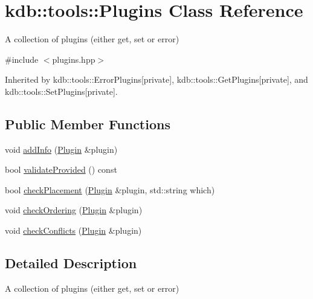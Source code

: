 \hypertarget{classkdb_1_1tools_1_1Plugins}{\section{kdb\-:\-:tools\-:\-:Plugins Class Reference}
\label{classkdb_1_1tools_1_1Plugins}
}


A collection of plugins (either get, set or error)  




{\ttfamily \#include $<$plugins.\-hpp$>$}



Inherited by kdb\-::tools\-::\-Error\-Plugins{\ttfamily  \mbox{[}private\mbox{]}}, kdb\-::tools\-::\-Get\-Plugins{\ttfamily  \mbox{[}private\mbox{]}}, and kdb\-::tools\-::\-Set\-Plugins{\ttfamily  \mbox{[}private\mbox{]}}.

\subsection*{Public Member Functions}
\begin{DoxyCompactItemize}
\item 
void \hyperlink{classkdb_1_1tools_1_1Plugins_a6d7e2c60d92999c025455669464f38c3}{add\-Info} (\hyperlink{classkdb_1_1tools_1_1Plugin}{Plugin} \&plugin)
\item 
bool \hyperlink{classkdb_1_1tools_1_1Plugins_abe177b76059687759c1f185db2b5463c}{validate\-Provided} () const 
\item 
bool \hyperlink{classkdb_1_1tools_1_1Plugins_ad2e5c69bacc5dcad0f8a8dd6ef5893f7}{check\-Placement} (\hyperlink{classkdb_1_1tools_1_1Plugin}{Plugin} \&plugin, std\-::string which)
\item 
void \hyperlink{classkdb_1_1tools_1_1Plugins_a23729cbfff5127dc2de21651d855bdbd}{check\-Ordering} (\hyperlink{classkdb_1_1tools_1_1Plugin}{Plugin} \&plugin)
\item 
void \hyperlink{classkdb_1_1tools_1_1Plugins_a15432e4b3a4ba47eaa999f7dcc588562}{check\-Conflicts} (\hyperlink{classkdb_1_1tools_1_1Plugin}{Plugin} \&plugin)
\end{DoxyCompactItemize}


\subsection{Detailed Description}
A collection of plugins (either get, set or error) 

